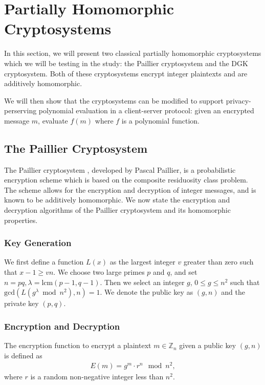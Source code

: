 \section{Partially Homomorphic Cryptosystems}

In this section, we will present two classical partially homomorphic cryptosystems which we will be testing in the study: the Paillier cryptosystem and the DGK cryptosystem. Both of these cryptosystems encrypt integer plaintexts and are additively homomorphic.

We will then show that the cryptosystems can be modified to support privacy-perserving polynomial evaluation in a client-server protocol: given an encrypted message $m$, evaluate $f(m)$ where $f$ is a polynomial function.

\subsection{The Paillier Cryptosystem}
The Paillier cryptosystem \cite{stern_public-key_1999}, developed by Pascal Paillier, is a probabilistic encryption scheme which is based on the composite residuosity class problem. The scheme allows for the encryption and decryption of integer messages, and is known to be additively homomorphic. We now state the encryption and decryption algorithms of the Paillier cryptosystem and its homomorphic properties.

\subsubsection{Key Generation}
We first define a function $L(x)$ as the largest integer $v$ greater than zero such that $x-1 \geq vn$.
We choose two large primes $p$ and $q$, and set $n = pq, \lambda = \mathrm{lcm}(p-1,q-1)$.
Then we select an integer $g$, $0\leq g \leq n^2$ such that $\mathrm{gcd}(L(g^\lambda \bmod n^2), n) = 1$.
We denote the public key as $(g,n)$ and the private key $(p,q)$.

\subsubsection{Encryption and Decryption}
The encryption function to encrypt a plaintext $m \in \mathbb{Z}_n$ given a public key $(g,n)$ is defined as
\begin{align*}
  E(m) = g^m \cdot r^n \mod{n^2},
\end{align*}
where $r$ is a random non-negative integer less than $n^2$.

